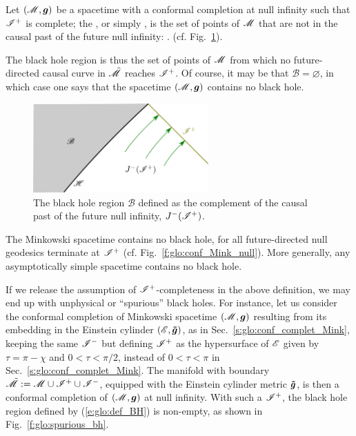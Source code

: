 \begin{greybox}
Let $(\mathscr{M},\bm{g})$ be a spacetime with a conformal completion at null infinity
such that $\mathscr{I}^+$ is complete;
the , or simply ,
is the set of points of $\mathscr{M}$ that are not in the causal past of the future null infinity:
\be \label{e:glo:def_BH}
     .
\ee
(cf. Fig.~\ref{f:glo:def_bh}).
\end{greybox}
The black hole region is thus the set of points of $\mathscr{M}$
from which no future-directed causal curve in $\tilde{\mathscr{M}}$ reaches $\mathscr{I}^+$.
Of course, it may be that $\mathscr{B} = \varnothing$, in which case one
says that the spacetime $(\mathscr{M},\bm{g})$ contains no black hole.


\begin{figure}
\centerline{\includegraphics[width=0.6\textwidth]{glo_def_bh.pdf}}
\caption[]{\label{f:glo:def_bh} \footnotesize
The black hole region $\mathscr{B}$ defined as the complement of
the causal past of the future null infinity, $J^-(\mathscr{I}^+)$.}
\end{figure}


\begin{example}
The Minkowski spacetime contains no black hole, for all future-directed null geodesics
terminate at $\mathscr{I}^+$ (cf. Fig.~\ref{f:glo:conf_Mink_null}).
More generally, any asymptotically simple spacetime contains no black hole.
\end{example}

\begin{remark} \label{s:glo:spurious_bh}
If we release the assumption of $\mathscr{I}^+$-completeness in the above definition,
we may end up with unphysical or ``spurious'' black holes.
For instance, let us consider the conformal completion of Minkowski spacetime
$(\mathscr{M},\bm{g})$ resulting from its embedding in the Einstein cylinder
$(\mathscr{E},\bm{\tilde{g}})$, as in
Sec.~\ref{s:glo:conf_complet_Mink},
keeping the same $\mathscr{I}^-$ but
defining $\mathscr{I}^+$ as the
hypersurface of $\mathscr{E}$ given by $\tau = \pi - \chi$
and $0<\tau<\pi/2$, instead of  $0<\tau<\pi$ in Sec.~\ref{s:glo:conf_complet_Mink}.
The manifold with boundary $\tilde{\mathscr{M}} := \mathscr{M} \cup \mathscr{I}^+ \cup \mathscr{I}^-$,
equipped with the Einstein cylinder metric $\bm{\tilde g}$, is then a conformal completion
of $(\mathscr{M},\bm{g})$ at null infinity. With such a $\mathscr{I}^+$, the black hole region
defined by (\ref{e:glo:def_BH}) is non-empty, as shown in Fig.~\ref{f:glo:spurious_bh}.
\end{remark}

